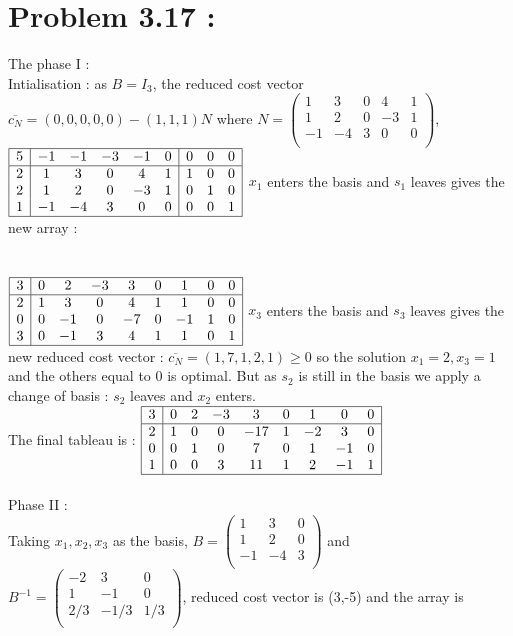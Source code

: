 \documentclass{article}
\begin{document}
\section*{Problem 3.17 :}
The phase I :\\
Intialisation : as $B = I_3$, the reduced cost vector $\overline{c_N} = (0,0,0,0,0) - (1,1,1)N$ where $N = \left(\begin{array}{ccccc}
    1&3&0&4&1\\
    1&2&0&-3&1\\
    -1&-4&3&0&0\\
\end{array}\right)$, 
$\begin{array}{|c|ccccc|ccc|}
    \hline
    5&-1 &-1&-3&-1&0&0&0&0\\
    \hline
    2 & 1&3&0&4&1&1&0&0\\
    2& 1 & 2 &0 &-3 &1 &0 &1 &0\\
    1 &-1&-4&3&0&0&0&0&1\\
    \hline
\end{array}$ $x_1$ enters the basis and $s_1$ leaves gives the new array :
\\\\\\
 $\begin{array}{|c|cccccccc|}
    \hline
    3 & 0&2&-3&3&0&1&0&0\\
    \hline
    2&1&3&0&4&1&1&0&0\\
    0&0&-1&0&-7&0&-1&1&0\\
    3&0&-1&3&4&1&1&0&1\\
    \hline
\end{array}$ $x_3$ enters the basis and $s_3$ leaves gives the new reduced cost vector : $\overline{c_N} = (1,7,1,2,1)\ge 0$ so the solution $x_1 = 2, x_3=1$ and the others equal to 0 is optimal. But as $s_2$ is still in the basis we apply a change of basis : $s_2$ leaves and $x_2$ enters.
\\
The final tableau is :
$\begin{array}{|c|cccccccc|}
    \hline
    3 & 0&2&-3&3&0&1&0&0\\
    \hline
    2&1&0&0&-17&1&-2&3&0\\
    0&0&1&0&7&0&1&-1&0\\
    1&0&0&3&11&1&2&-1&1\\
    \hline
\end{array}$
\\\\
Phase II :
\\
Taking $x_1,x_2,x_3$ as the basis, $B = \left(\begin{array}{ccc}
    1&3&0\\
    1&2&0\\
    -1&-4&3\\
\end{array}\right)$ and $B^{-1} = \left(\begin{array}{ccc}
    -2&3&0\\
    1&-1&0\\
    2/3&-1/3&1/3\\
\end{array}\right)$, reduced cost vector is (3,-5) and the array is 
\end{document}
